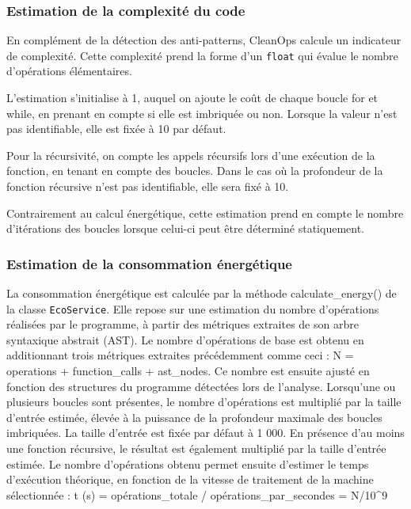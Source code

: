 \documentclass[a4paper,12pt]{article}
\begin{document}
\subsubsection{Estimation de la complexité du
code}\label{estimation-de-la-complexituxe9-du-code}

En complément de la détection des anti-patterns, CleanOps calcule un
indicateur de complexité. Cette complexité prend la forme d'un
\texttt{float} qui évalue le nombre d'opérations élémentaires.

L'estimation s'initialise à 1, auquel on ajoute le coût de chaque boucle
for et while, en prenant en compte si elle est imbriquée ou non. Lorsque
la valeur n'est pas identifiable, elle est fixée à 10 par défaut.

Pour la récursivité, on compte les appels récursifs lors d'une exécution
de la fonction, en tenant en compte des boucles. Dans le cas où la
profondeur de la fonction récursive n'est pas identifiable, elle sera
fixé à 10.

Contrairement au calcul énergétique, cette estimation prend en compte le
nombre d'itérations des boucles lorsque celui-ci peut être déterminé
statiquement.

\subsubsection{Estimation de la consommation
énergétique}\label{estimation-de-la-consommation-uxe9nerguxe9tique}

La consommation énergétique est calculée par la méthode
calculate\_energy() de la classe \texttt{EcoService}. Elle repose sur
une estimation du nombre d'opérations réalisées par le programme, à
partir des métriques extraites de son arbre syntaxique abstrait (AST).
Le nombre d'opérations de base est obtenu en additionnant trois
métriques extraites précédemment comme ceci : N = operations +
function\_calls + ast\_nodes. Ce nombre est ensuite ajusté en fonction
des structures du programme détectées lors de l'analyse. Lorsqu'une ou
plusieurs boucles sont présentes, le nombre d'opérations est multiplié
par la taille d'entrée estimée, élevée à la puissance de la profondeur
maximale des boucles imbriquées. La taille d'entrée est fixée par défaut
à 1 000. En présence d'au moins une fonction récursive, le résultat est
également multiplié par la taille d'entrée estimée. Le nombre
d'opérations obtenu permet ensuite d'estimer le temps d'exécution
théorique, en fonction de la vitesse de traitement de la machine
sélectionnée : t (s) = opérations\_totale / opérations\_par\_secondes =
N/10\^{}9
\end{document}
